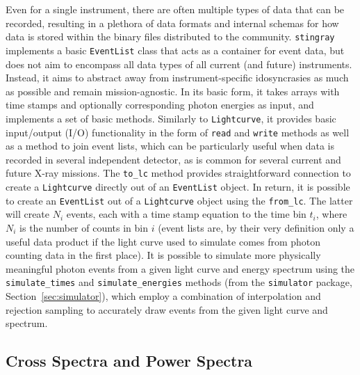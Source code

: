 \documentclass[twocolumn]{aastex62}
\newcommand{\stingray}{\texttt{stingray}\xspace}
\newcommand{\lightcurve}{\texttt{Lightcurve}\xspace}
\newcommand{\eventlist}{\texttt{EventList}\xspace}
\begin{document}
Even for a single instrument, there are often multiple types of data that can be recorded, resulting in a plethora of data formats and internal schemas for how data is stored within the binary files distributed to the community. 
\stingray implements a basic \eventlist class that acts as a container for event data, but does not aim to encompass all data types of all current (and future) instruments. 
Instead, it aims to abstract away from instrument-specific idosyncrasies as much as possible and remain mission-agnostic. 
In its basic form, it takes arrays with time stamps and optionally corresponding photon energies as input, and implements a set of basic methods. 
Similarly to \lightcurve, it provides basic input/output (I/O) functionality in the form of \texttt{read} and \texttt{write} methods as well as a method to join event lists, which can be particularly useful when data is recorded in several independent detector, as is common for several current and future X-ray missions. 
The \verb|to_lc| method provides straightforward connection to create a \lightcurve directly out of an \eventlist object. 
In return, it is possible to create an \eventlist out of a \lightcurve object using the \verb|from_lc|. 
The latter will create $N_i$ events, each with a time stamp equation to the time bin $t_i$, where $N_i$ is the number of counts in bin $i$ (event lists are, by their very definition only a useful data product if the light curve used to simulate comes from photon counting data in the first place). 
It is possible to simulate more physically meaningful photon events from a given light curve and energy spectrum using the \verb|simulate_times| and \verb|simulate_energies| methods (from the \texttt{simulator} package, Section~\ref{sec:simulator}), which employ a combination of interpolation and rejection sampling to accurately draw events from the given light curve and spectrum.


\subsection{Cross Spectra and Power Spectra}
\label{sec:csps}
\end{document}
